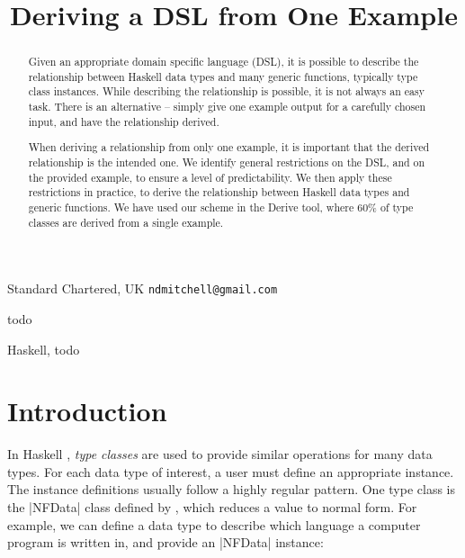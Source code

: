 \documentclass[preprint]{sigplanconf}
\begin{document}
\copyrightdata{[to be supplied]}

\titlebanner{\today{} - \currenttime{}}        %
\preprintfooter{}   %

\title{Deriving a DSL from One Example}

           {Standard Chartered, UK}
           {\verb"ndmitchell@gmail.com"}

\maketitle

\begin{abstract}
Given an appropriate domain specific language (DSL), it is possible to describe the relationship between Haskell data types and many generic functions, typically type class instances. While describing the relationship is possible, it is not always an easy task. There is an alternative -- simply give one example output for a carefully chosen input, and have the relationship derived.

When deriving a relationship from only one example, it is important that the derived relationship is the intended one. We identify general restrictions on the DSL, and on the provided example, to ensure a level of predictability. We then apply these restrictions in practice, to derive the relationship between Haskell data types and generic functions. We have used our scheme in the Derive tool, where 60\% of type classes are derived from a single example.
\end{abstract}


\terms
todo

\keywords
Haskell, todo

\section{Introduction}

In Haskell \cite{haskell}, \textit{type classes} \cite{wadler:type_classes} are used to provide similar operations for many data types. For each data type of interest, a user must define an appropriate instance. The instance definitions usually follow a highly regular pattern. One type class is the |NFData| class defined by \citet{trinder:strategies}, which reduces a value to normal form. For example, we can define a data type to describe which language a computer program is written in, and provide an |NFData| instance:
\end{document}
